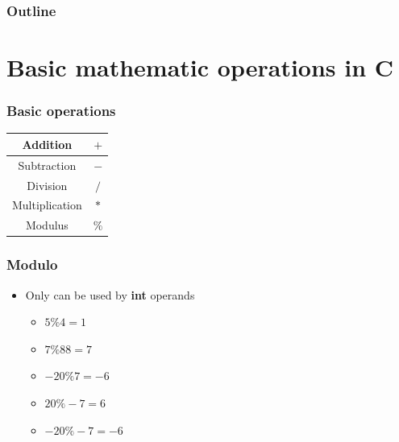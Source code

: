 \documentclass{../c-lecture}
\subtitle{Calculation}
\begin{document}
\begin{frame}
  \titlepage{}
\end{frame}
\begin{frame}
  \frametitle{Outline}
  \tableofcontents{}
\end{frame}

\section{Basic mathematic operations in C}

\begin{frame}
  \frametitle{Basic operations}
  \begin{table}
  \begin{tabular}{cc}
    \toprule

    Addition &
    $+$\\

    \midrule

    Subtraction &
    $-$\\

    \midrule

    Division &
    $/$\\

    \midrule

    Multiplication &
    $*$\\

    \midrule

    Modulus &
    $\%$\\

    \bottomrule
  \end{tabular}
  \end{table}
\end{frame}

\begin{frame}
  \frametitle{Modulo}
  \begin{itemize}
    \item Only can be used by \textbf{\color{Orange} int} operands
    \begin{itemize}
      \item $5 \% 4 = 1$
      \item $7 \% 88 = 7$
      \item $-20 \% 7 = -6$
      \item $20 \% -7 = 6$
      \item $-20 \% -7 = -6$
    \end{itemize}
  \end{itemize}
\end{frame}
\end{document}
